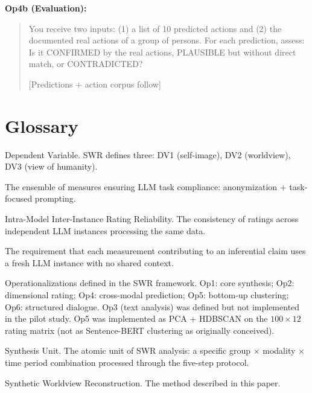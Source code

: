 \documentclass[11pt,a4paper]{article}
\begin{document}
\textbf{Op4b (Evaluation):}
\begin{quote}
\small\ttfamily
You receive two inputs: (1) a list of 10 predicted actions and (2) the documented real actions of a group of persons. For each prediction, assess: Is it CONFIRMED by the real actions, PLAUSIBLE but without direct match, or CONTRADICTED?

[Predictions + action corpus follow]
\end{quote}


\section{Glossary}
\label{app:glossary}

\begin{description}[style=nextline, leftmargin=2cm]
  \item[DV] Dependent Variable. SWR defines three: DV1 (self-image), DV2 (worldview), DV3 (view of humanity).
  \item[Focus Control] The ensemble of measures ensuring LLM task compliance: anonymization + task-focused prompting.
  \item[IMIIRR] Intra-Model Inter-Instance Rating Reliability. The consistency of ratings across independent LLM instances processing the same data.
  \item[Instance Separation] The requirement that each measurement contributing to an inferential claim uses a fresh LLM instance with no shared context.
  \item[Op1--Op6] Operationalizations defined in the SWR framework. Op1: core synthesis; Op2: dimensional rating; Op4: cross-modal prediction; Op5: bottom-up clustering; Op6: structured dialogue. Op3 (text analysis) was defined but not implemented in the pilot study. Op5 was implemented as PCA + HDBSCAN on the $100 \times 12$ rating matrix (not as Sentence-BERT clustering as originally conceived).
  \item[SU] Synthesis Unit. The atomic unit of SWR analysis: a specific group $\times$ modality $\times$ time period combination processed through the five-step protocol.
  \item[SWR] Synthetic Worldview Reconstruction. The method described in this paper.
\end{description}
\end{document}
